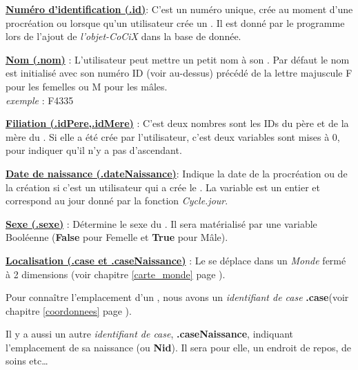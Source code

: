 \documentclass[french]{report}
\begin{document}
\begin{description}

\item[]\textbf{\underline{Numéro d'identification (.id)}}: C'est un numéro unique, crée au moment d'une procréation ou lorsque qu'un utilisateur crée un \CoCiX. Il est donné par le programme lors de l'ajout de \textit{l'objet-CoCiX} dans la base de donnée.\\

\item[]\textbf{\underline{Nom (.nom)}} : L'utilisateur peut mettre un petit nom à son \CoCiX. Par défaut le nom est initialisé avec son numéro ID (voir au-dessus) précédé de la lettre majuscule F pour les femelles ou M pour les mâles.\\
\textit{exemple }: 
F4335\\

\item[]\textbf{\underline{Filiation (.idPere,.idMere)}} : C'est deux nombres sont les IDs du père et de la mère du \CoCiX. Si elle a été crée par l'utilisateur, c'est deux variables sont mises à 0, pour indiquer qu'il n'y a pas d'ascendant.\\

\item[]\textbf{\underline{Date de naissance (.dateNaissance)}}: Indique la date de la procréation ou de la création si c'est un utilisateur qui a crée le \CoCiX. La variable est un entier et correspond au jour donné par la fonction \textit{Cycle.jour}.\\

\item[]\textbf{\underline{Sexe (.sexe)} }: Détermine le sexe du \CoCiX. Il sera matérialisé par une variable Booléenne (\textbf{False} pour Femelle et \textbf{True} pour Mâle).\\ 

\item \textbf{\underline{Localisation (.case et .caseNaissance)}} :  Le \CoCiX se déplace dans un \textit{Monde} fermé à 2 dimensions (voir chapitre \ref{carte_monde} page \pageref{carte_monde}).

Pour connaître l'emplacement d'un \CoCiX, nous avons un \textit{identifiant de case} \textbf{.case}(voir chapitre \ref{coordonnees} page \pageref{coordonnees}).

Il y a aussi un autre \textit{identifiant de case}, \textbf{.caseNaissance}, indiquant l'emplacement de sa naissance (ou \textbf{Nid}). Il sera pour elle, un endroit de repos, de soins etc\dots \label{nid}\\


\end{description}
\end{document}
